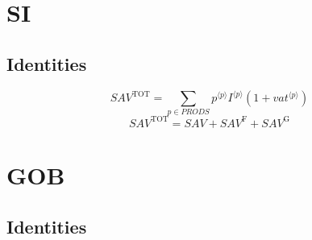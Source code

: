 \section{SI}

\subsection{Identities}

\begin{equation}
{S\!A\!V}^{\mathrm{TOT}} = \sum_{p\in {P\!R\!O\!D\!S}} {{p}^{\langle p\rangle}} {{I}^{\langle p\rangle}} \left(1 + {{v\!a\!t}}^{\langle p\rangle}\right)
\end{equation}
\begin{equation}
{S\!A\!V}^{\mathrm{TOT}} = {S\!A\!V} + {S\!A\!V}^{\mathrm{F}} + {S\!A\!V}^{\mathrm{G}}
\end{equation}




\section{GOB}

\subsection{Identities}

